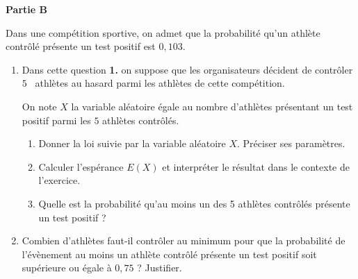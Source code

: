\documentclass[10pt]{article}
\begin{document}
\bigskip

\textbf{Partie B}

\medskip

Dans une compétition sportive, on admet que la probabilité qu'un athlète contrôlé présente un test positif est $0,103$.

\medskip

\begin{enumerate}
\item Dans cette question \textbf{1.} on suppose que les organisateurs décident de contrôler $5$ ~athlètes au hasard parmi les athlètes de cette compétition. 

On note $X$ la variable aléatoire égale au nombre d'athlètes présentant un test positif parmi les $5$ athlètes contrôlés.
	\begin{enumerate}
		\item Donner la loi suivie par la variable aléatoire $X$. Préciser ses paramètres.
		\item Calculer l'espérance $E(X)$ et interpréter le résultat dans le contexte de l'exercice.
		\item Quelle est la probabilité qu'au moins un des 5 athlètes contrôlés présente un test positif ?
	\end{enumerate}
\item Combien d'athlètes faut-il contrôler au minimum pour que la probabilité de l'évènement \og au moins un athlète contrôlé présente un test positif\fg{} soit supérieure ou égale à $0,75$ ? Justifier.
\end{enumerate}
\vspace{0,5cm}
\bigskip
\end{document}
